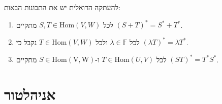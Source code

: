 \documentclass{tstextbook}
\begin{document}
\begin{proposition}
להעתקה הדואלית יש את התכונות הבאות:

  \begin{enumerate}
    \item לכל \(S,T \in \mathrm{Hom}(V,W)\) מתקיים \((S+T)^{*}=S^{*}+T^{*}\). 


    \item לכל \(\lambda \in \mathbb{F}\) ולכל \(T \in \mathrm{Hom}(V,W)\) נקבל כי \(\left( \lambda T \right)^{*}=\lambda T^{*}\). 


    \item לכל \(T \in \mathrm{Hom}(U,V)\) ו-\(S \in \mathrm{Hom(V,W)}\) מתקיים \((ST)^{*}=T^{*}S^{*}\). 


  \end{enumerate}
\end{proposition}
\section{אניהלטור}
\end{document}
